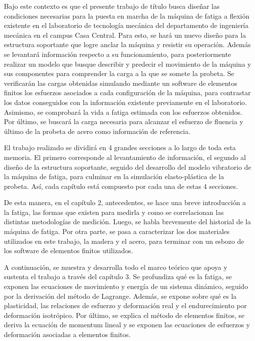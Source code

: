 Bajo este contexto es que el presente trabajo de título busca diseñar las condiciones necesarias para la puesta en marcha de la máquina de fatiga a flexión existente en el laboratorio de tecnología mecánica del departamento de ingeniería mecánica en el campus Casa Central. Para esto, se hará un nuevo diseño para la estructura soportante que logre anclar la máquina y resistir su operación. Además se levantará información respecto a su funcionamiento, para posteriormente realizar un modelo que busque describir y predecir el movimiento de la máquina y sus componentes para comprender la carga a la que se somete la probeta. Se verificarán las cargas obtenidas simulando mediante un software de elementos finitos los esfuerzos asociados a cada configuración de la máquina, para contrastar los datos conseguidos con la información existente previamente en el laboratorio. Asimismo, se comprobará la vida a fatiga estimada con los esfuerzos obtenidos. Por último, se buscará la carga necesaria para alcanzar el esfuerzo de fluencia y último de la probeta de acero como información de referencia.

El trabajo realizado se dividirá en 4 grandes secciones a lo largo de toda esta memoria. El primero corresponde al levantamiento de información, el segundo al diseño de la estructura soportante, seguido del desarrollo del modelo vibratorio de la máquina de fatiga, para culminar en la simulación elasto-plástica de la probeta. Así, cada capítulo está compuesto por cada una de estas 4 secciones.

De esta manera, en el capítulo 2, antecedentes, se hace una breve introducción a la fatiga, las formas que existen para medirla y como se correlacionan  las distintas metodologías de medición. Luego, se habla brevemente del historial de la máquina de fatiga. Por otra parte, se pasa a caracterizar los dos materiales utilizados en este trabajo, la madera y el acero, para terminar con un esbozo de los software de elementos finitos utilizados.

A continuación, se muestra y desarrolla todo el marco teórico que apoya y sustenta el trabajo a través del capítulo 3. Se profundiza qué es la fatiga, se exponen las ecuaciones de movimiento y energía de un sistema dinámico, seguido por la derivación del método de Lagrange. Además, se expone sobre qué es la plasticidad, las relaciones de esfuerzo y deformación real y el endurecimiento por deformación isotrópico. Por último, se explica el método de elementos finitos, se deriva la ecuación de momentum lineal y se exponen las ecuaciones de esfuerzos y deformación asociadas a elementos finitos.

